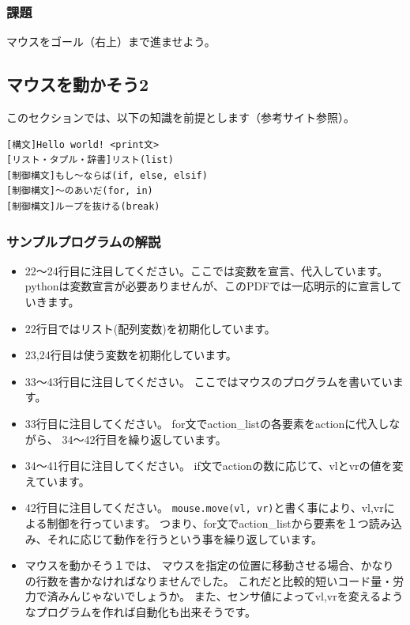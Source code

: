 \documentclass[11pt,a4paper]{jsarticle}
\begin{document}
\subsubsection{課題}
マウスをゴール（右上）まで進ませよう。


\newpage
\subsection{マウスを動かそう2}
このセクションでは、以下の知識を前提とします（参考サイト参照）。
\begin{lstlisting}[frame=single]
[構文]Hello world! <print文>
[リスト・タプル・辞書]リスト(list)
[制御構文]もし～ならば(if, else, elsif)
[制御構文]～のあいだ(for, in)
[制御構文]ループを抜ける(break)
\end{lstlisting}

\subsubsection{サンプルプログラムの解説}
\begin{itemize}
\item{}
22〜24行目に注目してください。ここでは変数を宣言、代入しています。
pythonは変数宣言が必要ありませんが、このPDFでは一応明示的に宣言していきます。
\item{}
22行目ではリスト(配列変数)を初期化しています。
\item{}
23,24行目は使う変数を初期化しています。
\item{}
33〜43行目に注目してください。
ここではマウスのプログラムを書いています。
\item{}
33行目に注目してください。
for文でaction\_listの各要素をactionに代入しながら、
34〜42行目を繰り返しています。
\item{}
34〜41行目に注目してください。
if文でactionの数に応じて、vlとvrの値を変えています。
\item{}
42行目に注目してください。
\verb|mouse.move(vl, vr)|と書く事により、vl,vrによる制御を行っています。
つまり、for文でaction\_listから要素を１つ読み込み、それに応じて動作を行うという事を繰り返しています。
\item{}
マウスを動かそう１では、
マウスを指定の位置に移動させる場合、かなりの行数を書かなければなりませんでした。
これだと比較的短いコード量・労力で済みんじゃないでしょうか。
また、センサ値によってvl,vrを変えるようなプログラムを作れば自動化も出来そうです。
\end{itemize}


\end{document}

